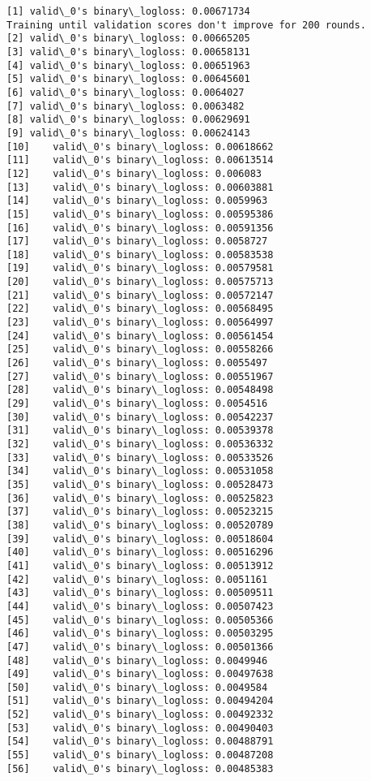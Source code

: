 \documentclass[11pt]{article}
\begin{document}
    \begin{Verbatim}[commandchars=\\\{\}]
[1]	valid\_0's binary\_logloss: 0.00671734
Training until validation scores don't improve for 200 rounds.
[2]	valid\_0's binary\_logloss: 0.00665205
[3]	valid\_0's binary\_logloss: 0.00658131
[4]	valid\_0's binary\_logloss: 0.00651963
[5]	valid\_0's binary\_logloss: 0.00645601
[6]	valid\_0's binary\_logloss: 0.0064027
[7]	valid\_0's binary\_logloss: 0.0063482
[8]	valid\_0's binary\_logloss: 0.00629691
[9]	valid\_0's binary\_logloss: 0.00624143
[10]	valid\_0's binary\_logloss: 0.00618662
[11]	valid\_0's binary\_logloss: 0.00613514
[12]	valid\_0's binary\_logloss: 0.006083
[13]	valid\_0's binary\_logloss: 0.00603881
[14]	valid\_0's binary\_logloss: 0.0059963
[15]	valid\_0's binary\_logloss: 0.00595386
[16]	valid\_0's binary\_logloss: 0.00591356
[17]	valid\_0's binary\_logloss: 0.0058727
[18]	valid\_0's binary\_logloss: 0.00583538
[19]	valid\_0's binary\_logloss: 0.00579581
[20]	valid\_0's binary\_logloss: 0.00575713
[21]	valid\_0's binary\_logloss: 0.00572147
[22]	valid\_0's binary\_logloss: 0.00568495
[23]	valid\_0's binary\_logloss: 0.00564997
[24]	valid\_0's binary\_logloss: 0.00561454
[25]	valid\_0's binary\_logloss: 0.00558266
[26]	valid\_0's binary\_logloss: 0.0055497
[27]	valid\_0's binary\_logloss: 0.00551967
[28]	valid\_0's binary\_logloss: 0.00548498
[29]	valid\_0's binary\_logloss: 0.0054516
[30]	valid\_0's binary\_logloss: 0.00542237
[31]	valid\_0's binary\_logloss: 0.00539378
[32]	valid\_0's binary\_logloss: 0.00536332
[33]	valid\_0's binary\_logloss: 0.00533526
[34]	valid\_0's binary\_logloss: 0.00531058
[35]	valid\_0's binary\_logloss: 0.00528473
[36]	valid\_0's binary\_logloss: 0.00525823
[37]	valid\_0's binary\_logloss: 0.00523215
[38]	valid\_0's binary\_logloss: 0.00520789
[39]	valid\_0's binary\_logloss: 0.00518604
[40]	valid\_0's binary\_logloss: 0.00516296
[41]	valid\_0's binary\_logloss: 0.00513912
[42]	valid\_0's binary\_logloss: 0.0051161
[43]	valid\_0's binary\_logloss: 0.00509511
[44]	valid\_0's binary\_logloss: 0.00507423
[45]	valid\_0's binary\_logloss: 0.00505366
[46]	valid\_0's binary\_logloss: 0.00503295
[47]	valid\_0's binary\_logloss: 0.00501366
[48]	valid\_0's binary\_logloss: 0.0049946
[49]	valid\_0's binary\_logloss: 0.00497638
[50]	valid\_0's binary\_logloss: 0.0049584
[51]	valid\_0's binary\_logloss: 0.00494204
[52]	valid\_0's binary\_logloss: 0.00492332
[53]	valid\_0's binary\_logloss: 0.00490403
[54]	valid\_0's binary\_logloss: 0.00488791
[55]	valid\_0's binary\_logloss: 0.00487208
[56]	valid\_0's binary\_logloss: 0.00485383

\end{Verbatim}
\end{document}
